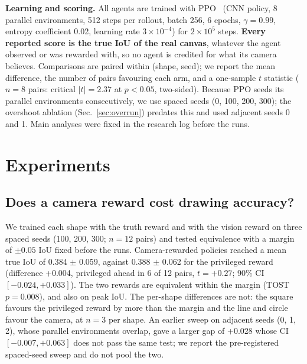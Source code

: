 \documentclass[conference]{IEEEtran}
\begin{document}
\textbf{Learning and scoring.} All agents are trained with PPO~\cite{F01} (CNN policy,
8 parallel environments, 512 steps per rollout, batch 256, 6 epochs, $\gamma=0.99$,
entropy coefficient 0.02, learning rate $3\times10^{-4}$) for $2\times10^5$ steps. %
\textbf{Every reported score is the true IoU of the real canvas}, whatever the agent
observed or was rewarded with, so no agent is credited for what its camera believes.
Comparisons are paired within (shape, seed); we report the mean difference, the number
of pairs favouring each arm, and a one-sample $t$ statistic ($n=8$ pairs: critical
$|t| = 2.37$ at $p<0.05$, two-sided). Because PPO seeds its parallel environments %
consecutively, we use spaced seeds (0, 100, 200, 300); the overshoot ablation
(Sec.~\ref{sec:overrun}) predates this and used adjacent seeds 0 and 1. Main analyses were fixed in the research
log before the runs.

\section{Experiments}

\subsection{Does a camera reward cost drawing accuracy?}
\label{sec:h2}
We trained each shape with the truth reward and with the vision reward on three spaced
seeds (100, 200, 300; $n=12$ pairs) and tested equivalence with a margin of $\pm0.05$ IoU
fixed before the runs. Camera-rewarded policies reached a mean true IoU of
0.384 $\pm$ 0.059, against 0.388 $\pm$ 0.062 for the privileged reward %
(difference +0.004, privileged ahead in 6 of 12 pairs, $t=+0.27$; 90\% CI $[-0.024, +0.033]$). %
The two rewards are equivalent within the margin (TOST $p=0.008$), and also on peak IoU. %
The per-shape differences are not: the square favours the privileged reward by more than
the margin and the line and circle favour the camera, at $n=3$ per shape. An earlier sweep
on adjacent seeds (0, 1, 2), whose parallel environments overlap, gave a larger gap of
+0.028 whose CI $[-0.007, +0.063]$ does not pass the same test; %
we report the pre-registered spaced-seed sweep and do not pool the two.
\end{document}
